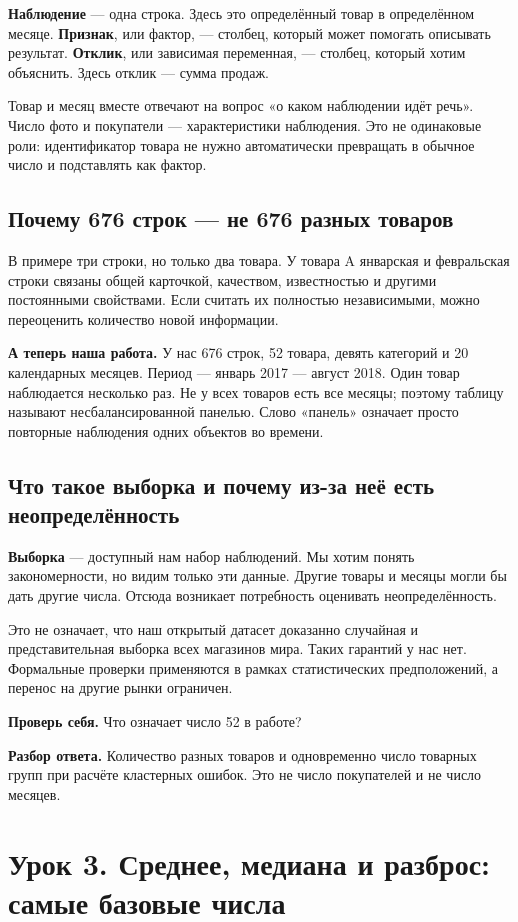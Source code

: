 \documentclass[12pt,a4paper]{article}
\newcommand{\ours}[1]{\par\textbf{А теперь наша работа.} #1\par}
\newcommand{\check}[2]{\par\textbf{Проверь себя.} #1\par\textbf{Разбор ответа.} #2\par}
\begin{document}
\textbf{Наблюдение} --- одна строка. Здесь это определённый товар в определённом месяце. \textbf{Признак}, или фактор, --- столбец, который может помогать описывать результат. \textbf{Отклик}, или зависимая переменная, --- столбец, который хотим объяснить. Здесь отклик --- сумма продаж.

Товар и месяц вместе отвечают на вопрос «о каком наблюдении идёт речь». Число фото и покупатели --- характеристики наблюдения. Это не одинаковые роли: идентификатор товара не нужно автоматически превращать в обычное число и подставлять как фактор.

\subsection{Почему 676 строк --- не 676 разных товаров}

В примере три строки, но только два товара. У товара A январская и февральская строки связаны общей карточкой, качеством, известностью и другими постоянными свойствами. Если считать их полностью независимыми, можно переоценить количество новой информации.

\ours{У нас 676 строк, 52 товара, девять категорий и 20 календарных месяцев. Период --- январь 2017 --- август 2018. Один товар наблюдается несколько раз. Не у всех товаров есть все месяцы; поэтому таблицу называют несбалансированной панелью. Слово «панель» означает просто повторные наблюдения одних объектов во времени.}

\subsection{Что такое выборка и почему из-за неё есть неопределённость}

\textbf{Выборка} --- доступный нам набор наблюдений. Мы хотим понять закономерности, но видим только эти данные. Другие товары и месяцы могли бы дать другие числа. Отсюда возникает потребность оценивать неопределённость.

Это не означает, что наш открытый датасет доказанно случайная и представительная выборка всех магазинов мира. Таких гарантий у нас нет. Формальные проверки применяются в рамках статистических предположений, а перенос на другие рынки ограничен.

\check{Что означает число 52 в работе?}{Количество разных товаров и одновременно число товарных групп при расчёте кластерных ошибок. Это не число покупателей и не число месяцев.}

\section{Урок 3. Среднее, медиана и разброс: самые базовые числа}
\end{document}
